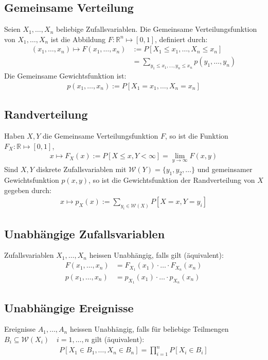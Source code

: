 \documentclass[8pt]{extarticle}
\newcommand{\R}{\mathbb{R}}
\newcommand{\W}{\mathcal{W}}
\newcommand{\ra}{\rightarrow}
\newcommand{\Pn}{\prod_{i = 1}^n}
\newcommand{\ereignisse}{A_1, \dots, A_n}
\newcommand{\zufallsvariablen}{X_1, \dots, X_n}
\begin{document}
\begin{multicols*}{3}
  \subsection*{Gemeinsame Verteilung}
  Seien $\zufallsvariablen$ beliebige Zufallsvariablen. Die Gemeinsame
  Verteilungsfunktion von $\zufallsvariablen$ ist die Abbildung $F: \R^n \mapsto
    [0, 1]$, definiert durch:
  \begin{align*}
     (x_1, \dots, x_n) \mapsto F (x_1, \dots, x_n) & := P[X_1 \leq x_1, \dots, X_n \leq x_n]                       \\
                                                 & = \sum_{y_1 \leq x_1, \dots, y_n \leq x_n} p (y_1, \dots, y_n)
  \end{align*}
  Die Gemeinsame Gewichtsfunktion ist:
  \begin{align*}
    p (x_1, \dots, x_n) := P[X_1 = x_1, \dots, X_n = x_n]
  \end{align*}
  \subsection*{Randverteilung}
  Haben $X, Y$ die Gemeinsame Verteilungsfunktion $F$, so ist die Funktion $F_X:
    \R \mapsto [0, 1]$,
  \begin{align*}
    x \mapsto F_X (x) := P[X \leq x, Y < \infty] = \lim_{y \ra \infty} F (x, y)
  \end{align*}
  Sind $X, Y$ diskrete Zufallsvariablen mit $\W (Y) = \{y_1, y_2, \dots\}$
  und gemeinsamer Gewichtsfunktion $p (x, y)$, so ist die Gewichtsfunktion
  der Randverteilung von $X$ gegeben durch:
  \begin{align*}
    x \mapsto p_X (x) := \sum_{y_i \in \W (X)} P[X = x, Y = y_i]
  \end{align*}
  \subsection*{Unabhängige Zufallsvariablen}
  Zufallsvariablen $\zufallsvariablen$ heissen Unabhängig, falls gilt (äquivalent):
  \begin{align*}
    F (x_1, \dots, x_n) & = F_{X_1} (x_1) \cdot \hdots \cdot F_{X_n} (x_n) \\
    p (x_1, \dots, x_n) & = p_{X_1} (x_1) \cdot \hdots \cdot p_{X_n} (x_n)
  \end{align*}
  \subsection*{Unabhängige Ereignisse}
  Ereignisse $\ereignisse$ heissen Unabhängig, falls für beliebige Teilmengen
  $B_i \subseteq \W (X_i) \quad i = 1, \dots, n$ gilt  (äquivalent):
  \begin{align*}
    P[X_1 \in B_1, \dots, X_n \in B_n] = \Pn P[X_i \in B_i]
  \end{align*}

\end{multicols*}
\end{document}
